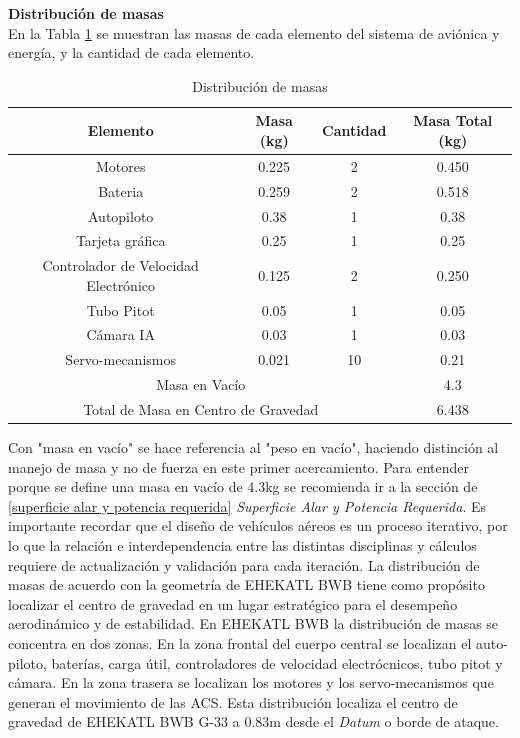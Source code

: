 \textbf{Distribución de masas}\\ 
En la Tabla \ref{Distribucion de masas} se muestran las masas de cada elemento del sistema de aviónica y energía, y la cantidad de cada elemento. 
\begin{table}[!h]
    \centering
    \caption{Distribución de masas}
    \begin{tabular}{|c|c|c|c|}
    \hline
    \textbf{Elemento} & \textbf{Masa (kg)} & \textbf{Cantidad} & \textbf{Masa Total (kg)} \\
    \hline
    Motores & 0.225 & 2 & 0.450 \\ 
    Bateria & 0.259 & 2  & 0.518 \\
    Autopiloto & 0.38 & 1 & 0.38 \\
    Tarjeta gráfica & 0.25 & 1 & 0.25 \\
    Controlador de Velocidad Electrónico & 0.125 & 2 & 0.250 \\
    Tubo Pitot & 0.05 & 1 & 0.05 \\
    Cámara IA & 0.03 & 1 & 0.03 \\
    Servo-mecanismos & 0.021 & 10 & 0.21 \\
    \hline
    \multicolumn{3}{|c|}{ Masa en Vacío} & 4.3\\
    \hline
    \multicolumn{3}{|c|}{Total de Masa en Centro de Gravedad} & 6.438\\
    \hline
    \end{tabular}
    \label{Distribucion de masas}
\end{table}
Con "masa en vacío" se hace referencia al "peso en vacío", haciendo distinción al manejo de masa y no de fuerza en este primer acercamiento. 
Para entender porque se define una masa en vacío de 4.3kg se recomienda ir a la sección de \ref{superficie alar y potencia requerida} \textit{Superficie Alar y Potencia Requerida}.
Es importante recordar que el diseño de vehículos aéreos es un proceso iterativo, por lo que la relación e interdependencia entre las distintas disciplinas y cálculos requiere de actualización y validación para cada iteración. 
La distribución de masas de acuerdo con la geometría de EHEKATL BWB tiene como propósito localizar el centro de gravedad en un lugar estratégico para el desempeño aerodinámico y de estabilidad. 
En EHEKATL BWB la distribución de masas se concentra en dos zonas. En la zona frontal del cuerpo central se localizan el auto-piloto, baterías, carga útil, controladores de velocidad electrócnicos, tubo pitot y cámara. En la zona trasera se localizan los motores y los servo-mecanismos que generan el movimiento de las ACS. Esta distribución localiza el centro de gravedad de EHEKATL BWB G-33 a 0.83m desde el \textit{Datum} o borde de ataque. 


